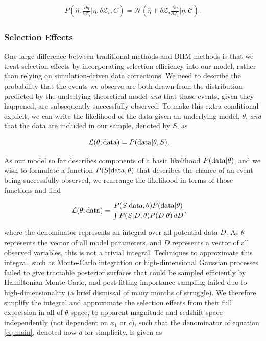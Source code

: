 \documentclass[a4paper,fleqn,usenatbib]{mnras}
\newcommand{\cov}{\mathcal{C}}
\newcommand{\Z}{\mathcal{Z}}
\begin{document}
\begin{align}
P\left(\hat{\eta}, \frac{\partial \hat{\eta}}{\partial \Z_i} | \eta, \delta \Z_i, C\right) = \mathcal{N}\left(\hat{\eta} + \delta \Z_i \frac{\partial \hat{\eta}}{\partial \Z_i}|\eta,\cov\right). \label{eq:l3}
\end{align}



\subsubsection{Selection Effects}
\label{sec:selection}



One large difference between traditional methods and BHM methods is that we treat selection effects by incorporating selection efficiency into our model, rather than relying on simulation-driven data corrections. We need to describe the probability that the events we observe are both drawn from the distribution predicted by the underlying theoretical model \textit{and} that those events, given they happened, are subsequently successfully observed.  To make this extra conditional explicit, we can write the likelihood of the data given an underlying model, $\theta$, \textit{and} that the data are included in our sample, denoted by $S$, as

\begin{align}
\mathcal{L}(\theta; {\rm data}) &= P({\rm data} | \theta, S). \label{eq:like}
\end{align}

As our model so far describes components of a basic likelihood $P({\rm data}|\theta)$, and we wish to formulate a function $P(S|{\rm data},\theta)$ that describes the chance of an event being successfully observed, we rearrange the likelihood in terms of those functions and find

\begin{align}
\mathcal{L}(\theta; {\rm data}) &= \frac{P(S|{\rm data},\theta) P({\rm data}|\theta)}{\int P(S | D, \theta) P(D|\theta)\, dD}, \label{eq:main}
\end{align}

where the denominator represents an integral over all potential data $D$. As $\theta$ represents the vector of all model parameters, and $D$ represents a vector of all observed variables, this is not a trivial integral. Techniques to approximate this integral, such as Monte-Carlo integration or high-dimensional Gaussian processes failed to give tractable posterior surfaces that could be sampled efficiently by Hamiltonian Monte-Carlo, and post-fitting importance sampling failed due to high-dimensionality (a brief dismissal of many months of struggle). We therefore simplify the integral and approximate the selection effects from their full expression in all of $\theta$-space, to apparent magnitude and redshift space independently (not dependent on $x_1$ or $c$), such that the denominator of equation \eqref{eq:main}, denoted now $d$ for simplicity, is given as
\end{document}

